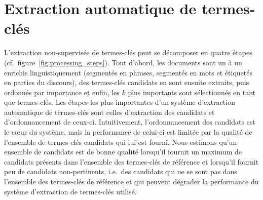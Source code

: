 \section{Extraction automatique de termes-clés}
\label{sec:extraction_automatique_de_termes_cles}
  L'extraction non-supervisée de termes-clés peut se décomposer en quatre
  étapes (cf.~figure~\ref{fig:processing_steps}). Tout d'abord, les documents
  sont un à un enrichis linguistiquement (segmentés en phrases, segmentés en
  mots et étiquetés en parties du discours), des termes-clés candidats en sont
  ensuite extraits, puis ordonnés par importance et enfin, les $k$ plus
  importants sont sélectionnés en tant que termes-clés. Les étapes les plus
  importantes d'un système d'extraction automatique de termes-clés sont celles
  d'extraction des candidats et d'ordonnancement de ceux-ci. Intuitivement,
  l'ordonnancement des candidats est le c\oe{}ur du système, mais la performance
  de celui-ci est limitée par la qualité de l'ensemble de termes-clés candidats
  qui lui est fourni. Nous estimons qu'un ensemble de candidats est de bonne
  qualité lorsqu'il fournit un maximum de candidats présents dans l'ensemble des
  termes-clés de référence et lorsqu'il fournit peu de candidats non-pertinents,
  i.e.~des candidats qui ne se sont pas dans l'ensemble des termes-clés de
  référence et qui peuvent dégrader la performance du système d'extraction de
  termes-clés utilisé.
